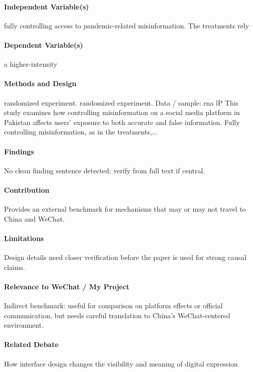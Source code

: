 \documentclass[12pt]{article}
\begin{document}
\paragraph{Independent Variable(s)} fully controlling access to pandemic-related misinformation. The treatments rely

\paragraph{Dependent Variable(s)} a higher-intensity

\paragraph{Methods and Design} randomized experiment. randomized experiment. Data / sample: rna lP This study examines how controlling misinformation on a social media platform in Pakistan affects users' exposure to both accurate and false information. Fully controlling misinformation, as in the treatments,...

\paragraph{Findings} No clean finding sentence detected; verify from full text if central.

\paragraph{Contribution} Provides an external benchmark for mechanisms that may or may not travel to China and WeChat.

\paragraph{Limitations} Design details need closer verification before the paper is used for strong causal claims.

\paragraph{Relevance to WeChat / My Project} Indirect benchmark: useful for comparison on platform effects or official communication, but needs careful translation to China's WeChat-centered environment.

\paragraph{Related Debate} How interface design changes the visibility and meaning of digital expression
\end{document}
